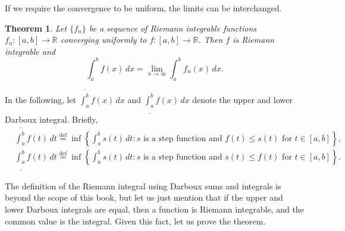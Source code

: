 \documentclass[12pt,openany]{book}
\newcommand{\R}{{\mathbb{R}}}
\theoremstyle{plain}
\newtheorem{thm}{Theorem}[section]
\theoremstyle{remark}
\theoremstyle{definition}
\theoremstyle{exercise}
\theoremstyle{example}
\begin{document}
If we require the convergence to be uniform, the limits can
be interchanged.

\begin{thm} \label{integralinterchange:thm}
Let $\{ f_n \}$ be a sequence of Riemann integrable
functions
$f_n \colon [a,b] \to \R$
converging uniformly to $f \colon [a,b]
\to \R$.  Then $f$ is Riemann integrable and
\begin{equation*}
\int_a^b f(x) \, dx = \lim_{n\to\infty} \int_a^b f_n(x) \, dx .
\end{equation*}
\end{thm}

In the following, let 
$\overline{\int_a^b} f(x)\, dx$ and 
$\underline{\int_a^b} f(x)\, dx$ denote the upper and lower Darboux integral.
Briefly,
\begin{align*}
& \overline{\int_a^b} f(t) \,dt
\overset{\text{def}}{=}
\inf \left\{ \int_a^b s(t) \, dt : s
\text{ is a step function and } f(t) \leq s(t) \text{ for } t \in
[a,b] \right\} ,
\\
& \underline{\int_a^b} f(t) \,dt
\overset{\text{def}}{=}
\inf \left\{ \int_a^b s(t) \, dt : s
\text{ is a step function and } s(t) \leq f(t) \text{ for } t \in
[a,b] \right\} .
\end{align*}


The definition of the Riemann integral using Darboux sums and integrals is
beyond the scope of this book, but let us just mention that 
if the upper and lower Darboux integrals are equal, then a function is
Riemann integrable, and the common value is the integral.  Given this fact,
let us prove the theorem.
\end{document}
